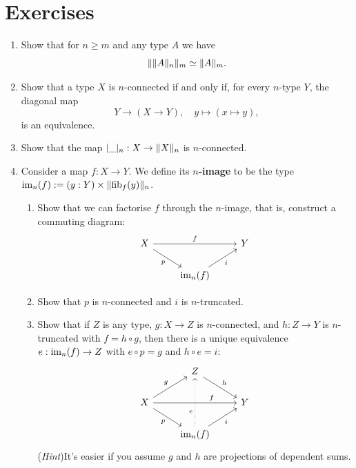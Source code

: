 \documentclass[10pt,oneside,leqno,openright]{memoir}
\begin{document}
\section{Exercises}
\begin{enumerate}
    \item Show that for $n \geq m$ and any type $A$ we have
    \[ \lVert\lVert A\rVert_n\rVert_m \simeq \lVert A\rVert_m. \]

  \item\label{ex:n-conn-orth}
    Show that a type $X$ is $n$-connected if and only if, for every $n$-type $Y$,
    the diagonal map
    \[ Y \to (X \to Y), \quad y\mapsto (x\mapsto y),
    \]
    is an equivalence.

  \item Show that the map $\lvert\_\rvert_n : X \to \lVert X\rVert_n$ is $n$-connected.

    \item Consider a map $f : X \to Y$.
      We define its \textbf{$n$-image} to be the type $\operatorname{im}_n(f) :=
      (y : Y) \times \lVert\operatorname{fib}_f(y)\rVert_n$.
    \begin{enumerate}
    \item Show that we can factorise $f$ through the $n$-image, that is,
      construct a commuting diagram:
        \[\begin{tikzcd}
            X \ar[rr, "f"] \ar[dr, swap, "p"] & & Y \\
            & \im_n(f) \ar[ur, swap, "i"]
        \end{tikzcd}\]
    \item Show that $p$ is $n$-connected and $i$ is $n$-truncated.
    \item Show that if $Z$ is any type, $g : X \to Z$ is $n$-connected, and $h:Z\to Y$ is $n$-truncated with $f = h\circ g$, then there is a unique equivalence $e : \operatorname{im}_n(f) \to Z$ with $e\circ p = g$ and $h\circ e = i$:
      \[
        \begin{tikzcd}
      & Z \ar[dr,"h"] & \\
      X \ar[rr,pos=0.7,"f"]\ar[dr,"p"'] \ar[ur,"g"]& & Y\\
      & \im_n(f)\ar[ur,"i"']\ar[uu,dotted,pos=0.3, "e"] &
    \end{tikzcd}
  \]
  (\emph{Hint})\enspace It's easier if you assume $g$ and $h$ are projections of
  dependent sums.
    \end{enumerate}


\end{enumerate}
\end{document}
